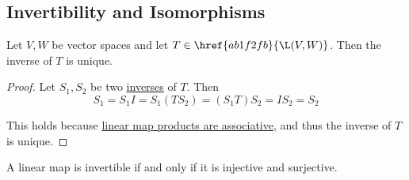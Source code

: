 \subsection{Invertibility and Isomorphisms}\label{f475f43}

\label{c2b81d6}

Let $V,W$ be vector spaces and let $T\in\href{ab1f2fb}{\L(V,W)}$. Then the
inverse of $T$ is unique.

\begin{proof}
  Let $S_1,S_2$ be two \href{e1ba7ee}{inverses} of $T$. Then
  $$
    S_1=S_1I=S_1(TS_2)=(S_1T)S_2=IS_2=S_2
  $$

  This holds because \href{b42b8cd}{linear map products are associative}, and
  thus the inverse of $T$ is unique.
\end{proof}

\label{c1de7b1}

A linear map is invertible if and only if it is injective and surjective.

